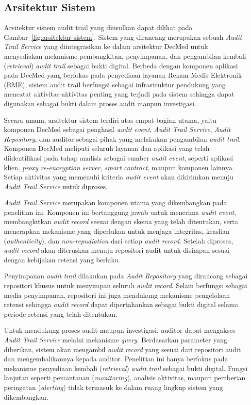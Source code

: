 \subsection{Arsitektur Sistem}

Arsitektur sistem audit trail yang diusulkan dapat dilihat pada Gambar~\ref{fig:arsitektur-sistem}. Sistem yang dirancang merupakan sebuah \textit{Audit Trail Service} yang diintegrasikan ke dalam arsitektur DecMed untuk menyediakan mekanisme pembangkitan, penyimpanan, dan pengambilan kembali (\textit{retrieval}) \textit{audit trail} sebagai bukti digital. Berbeda dengan komponen aplikasi pada DecMed yang berfokus pada penyediaan layanan Rekam Medis Elektronik (RME), sistem audit trail berfungsi sebagai infrastruktur pendukung yang mencatat aktivitas-aktivitas penting yang terjadi pada sistem sehingga dapat digunakan sebagai bukti dalam proses audit maupun investigasi.



Secara umum, arsitektur sistem terdiri atas empat bagian utama, yaitu komponen DecMed sebagai penghasil \textit{audit event}, \textit{Audit Trail Service}, \textit{Audit Repository}, dan auditor sebagai pihak yang melakukan pengambilan \textit{audit trail}. Komponen DecMed meliputi seluruh layanan dan aplikasi yang telah diidentifikasi pada tahap analisis sebagai sumber \textit{audit event}, seperti aplikasi klien, \textit{proxy re-encryption server}, \textit{smart contract}, maupun komponen lainnya. Setiap aktivitas yang memenuhi kriteria \textit{audit event} akan dikirimkan menuju \textit{Audit Trail Service} untuk diproses.

\textit{Audit Trail Service} merupakan komponen utama yang dikembangkan pada penelitian ini. Komponen ini bertanggung jawab untuk menerima \textit{audit event}, membangkitkan \textit{audit record} sesuai dengan skema yang telah ditentukan, serta menerapkan mekanisme yang diperlukan untuk menjaga integritas, keaslian (\textit{authenticity}), dan \textit{non-repudiation} dari setiap \textit{audit record}. Setelah diproses, \textit{audit record} akan diteruskan menuju repositori audit untuk disimpan sesuai dengan kebijakan retensi yang berlaku.

Penyimpanan \textit{audit trail} dilakukan pada \textit{Audit Repository} yang dirancang sebagai repositori khusus untuk menyimpan seluruh \textit{audit record}. Selain berfungsi sebagai media penyimpanan, repositori ini juga mendukung mekanisme pengelolaan retensi sehingga \textit{audit record} dapat dipertahankan sebagai bukti digital selama periode retensi yang telah ditentukan.

Untuk mendukung proses audit maupun investigasi, auditor dapat mengakses \textit{Audit Trail Service} melalui mekanisme \textit{query}. Berdasarkan parameter yang diberikan, sistem akan mengambil \textit{audit record} yang sesuai dari repositori audit dan mengembalikannya kepada auditor. Penelitian ini hanya berfokus pada mekanisme penyediaan kembali (\textit{retrieval}) \textit{audit trail} sebagai bukti digital. Fungsi lanjutan seperti pemantauan (\textit{monitoring}), analisis aktivitas, maupun pemberian peringatan (\textit{alerting}) tidak termasuk ke dalam ruang lingkup sistem yang dikembangkan.